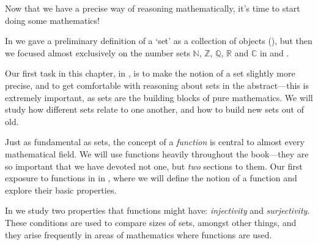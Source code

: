 Now that we have a precise way of reasoning mathematically, it's time to start doing some mathematics!

In  we gave a preliminary definition of a `set' as a collection of objects (), but then we focused almost exclusively on the number sets $\mathbb{N}$, $\mathbb{Z}$, $\mathbb{Q}$, $\mathbb{R}$ and $\mathbb{C}$ in  and .

Our first task in this chapter, in , is to make the notion of a set slightly more precise, and to get comfortable with reasoning about sets in the abstract---this is extremely important, as sets are the building blocks of pure mathematics. We will study how different sets relate to one another, and how to build new sets out of old.

Just as fundamental as sets, the concept of a \textit{function} is central to almost every mathematical field. We will use functions heavily throughout the book---they are so important that we have devoted not one, but \textit{two} sections to them. Our first exposure to functions in in , where we will define the notion of a function and explore their basic properties.

In  we study two properties that functions might have: \textit{injectivity} and \textit{surjectivity}. These conditions are used to compare sizes of sets, amongst other things, and they arise frequently in areas of mathematics where functions are used.

